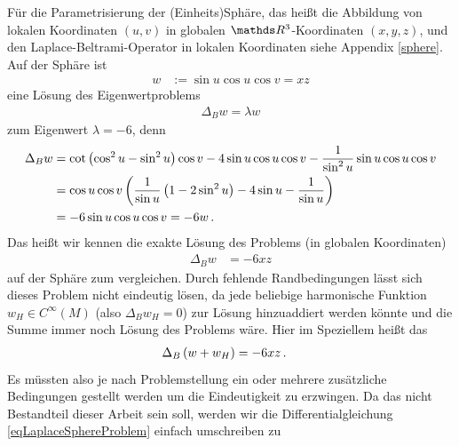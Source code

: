     \begin{beispiel}[Einheitssphäre]
       Für die Parametrisierung der (Einheits)Sphäre, das heißt die Abbildung von lokalen Koordinaten
       \( \left( u,v \right) \) in globalen \(\R^{3} \)-Koordinaten \( \left( x,y,z \right) \), 
       und den Laplace-Beltrami-Operator in lokalen Koordinaten siehe Appendix \ref{sphere}.
       Auf der Sphäre ist
       \begin{align}
         w &:= \sin u \cos u \cos v = x z
       \end{align}
       eine Lösung des Eigenwertproblems
       \begin{align}
         \Delta_{B} w = \lambda w
       \end{align}
       zum Eigenwert \( \lambda = -6 \), denn
       \begin{align}
         \Delta_{B} w &= \cot\left( \cos^{2}u - \sin^{2}u \right)\cos v
                         - 4\sin u \cos u \cos v
                         - \frac{1}{\sin^{2} u} \sin u \cos u \cos v \\
                      &= \cos u \cos v \left( \frac{1}{\sin u} \left( 1 - 2\sin^{2} u \right)
                                             - 4 \sin u - \frac{1}{\sin u} \right) \\
                      &= -6 \sin u \cos u \cos v = -6 w \,\text{.}
       \end{align}
       Das heißt wir kennen die exakte Lösung des Problems (in globalen Koordinaten)
       \begin{align}
         \label{eqLaplaceSphereProblem}
         \Delta_{B} w &= -6 x z
       \end{align}
       auf der Sphäre zum vergleichen.
       Durch fehlende Randbedingungen lässt sich dieses Problem nicht eindeutig lösen, da jede beliebige harmonische Funktion
       \( w_{H} \in C^{\infty}(M) \) (also \( \Delta_{B} w_{H} = 0 \)) zur Lösung hinzuaddiert werden könnte und die Summe immer noch
       Lösung des Problems wäre. Hier im Speziellem heißt das
       \begin{align}
         \Delta_{B} \left( w + w_{H} \right) &= -6 x z \,\text{.}
       \end{align}
       Es müssten also je nach Problemstellung ein oder mehrere zusätzliche Bedingungen gestellt werden um die Eindeutigkeit zu erzwingen.
       Da das nicht Bestandteil dieser Arbeit sein soll, werden wir die Differentialgleichung \eqref{eqLaplaceSphereProblem} einfach umschreiben zu
       \begin{align}

\end{align}
\end{beispiel}
